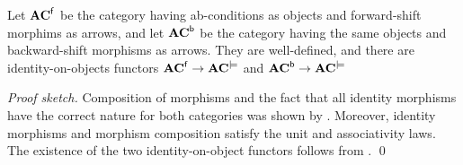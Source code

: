 \begin{theorem}
Let $\mathbf{AC}^{{\mathsf{f}}}$ be the category having ab-conditions as objects and forward-shift morphims as arrows, and let $\mathbf{AC}^{{\mathsf{b}}}$ be the category having the same objects and backward-shift morphisms as arrows. They are well-defined, and there are identity-on-objects functors $\mathbf{AC}^{{\mathsf{f}}} \rightarrow \mathbf{AC}^{\models}$ and $\mathbf{AC}^{{\mathsf{b}}} \rightarrow \mathbf{AC}^{\models}$
\end{theorem}
%
\emph{Proof sketch.} Composition of morphisms and the fact that all identity morphisms have the correct nature for both categories was shown by .
Moreover, identity morphisms and morphism composition satisfy the unit and associativity laws. The existence of the two identity-on-object functors follows from .
\qed 

